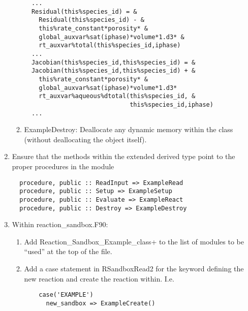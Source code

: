 \begin{enumerate}
\begin{enumerate}[label=\alph*]
  \begin{verbatim}
  ...
  Residual(this%species_id) = &
    Residual(this%species_id) - &
    this%rate_constant*porosity* &
    global_auxvar%sat(iphase)*volume*1.d3* &
    rt_auxvar%total(this%species_id,iphase)
  ...
  Jacobian(this%species_id,this%species_id) = &
  Jacobian(this%species_id,this%species_id) + &
    this%rate_constant*porosity* &
    global_auxvar%sat(iphase)*volume*1.d3*
    rt_auxvar%aqueous%dtotal(this%species_id, &
                             this%species_id,iphase)
  ...
  \end{verbatim}
      \item ExampleDestroy: Deallocate any dynamic memory within the class (without deallocating the object itself).
    \end{enumerate}
  \item Ensure that the methods within the extended derived type point to the proper procedures in the module
  \begin{verbatim}
  procedure, public :: ReadInput => ExampleRead
  procedure, public :: Setup => ExampleSetup
  procedure, public :: Evaluate => ExampleReact
  procedure, public :: Destroy => ExampleDestroy
  \end{verbatim}
  \item Within reaction\_sandbox.F90:
    \begin{enumerate}[label=\alph*]
      \item Add Reaction\_Sandbox\_Example\_class+ to the list of modules to be ``used'' at the top of the file.
      \item Add a case statement in RSandboxRead2 for the keyword defining the new reaction and create the reaction within.  I.e.
  \begin{verbatim}
    case('EXAMPLE')
      new_sandbox => ExampleCreate()
  \end{verbatim}
    \end{enumerate}
\end{enumerate}

